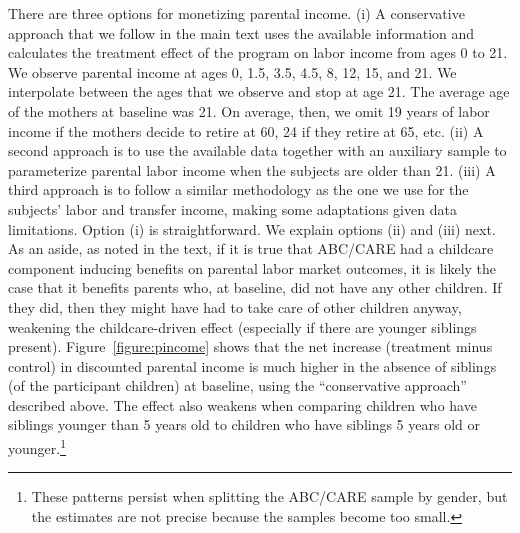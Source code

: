 \noindent There are three options for monetizing parental income. (i) A conservative approach that we follow in the main text uses the available information and calculates the treatment effect of the program on labor income from ages 0 to 21. We observe parental income at ages 0, 1.5, 3.5, 4.5, 8, 12, 15, and 21. We interpolate between the ages that we observe and stop at age 21. The average age of the mothers at baseline was 21. On average, then, we omit 19 years of labor income if the mothers decide to retire at 60, 24 if they retire at 65, etc. (ii) A second approach is to use the available data together with an auxiliary sample to parameterize parental labor income when the subjects are older than 21. (iii) A third approach is to follow a similar methodology as the one we use for the subjects' labor and transfer income, making some adaptations given data limitations. Option (i) is straightforward. We explain options (ii) and (iii) next.\\

\noindent As an aside, as noted in the text, if it is true that ABC/CARE had a childcare component inducing benefits on parental labor market outcomes, it is likely the case that it benefits parents who, at baseline, did not have any other children. If they did, then they might have had to take care of other children anyway, weakening the childcare-driven effect (especially if there are younger siblings present). Figure~\ref{figure:pincome} shows that the net increase (treatment minus control) in discounted parental income is much higher in the absence of siblings (of the participant children) at baseline, using the ``conservative approach'' described above. The effect also weakens when comparing children who have siblings younger than 5 years old to children who have siblings 5 years old or younger.\footnote{These patterns persist when splitting the ABC/CARE sample by gender, but the estimates are not precise because the samples become too small.}

